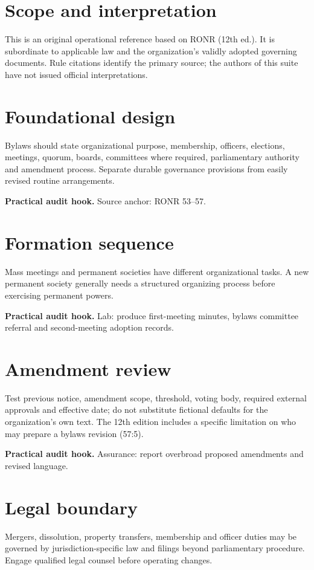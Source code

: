 \documentclass[11pt]{article}
\begin{document}
\SuiteOpen
\section{Scope and interpretation}
This is an original operational reference based on RONR (12th ed.). It is subordinate to applicable law and the organization’s validly adopted governing documents. Rule citations identify the primary source; the authors of this suite have not issued official interpretations.

\section{Foundational design}
Bylaws should state organizational purpose, membership, officers, elections, meetings, quorum, boards, committees where required, parliamentary authority and amendment process. Separate durable governance provisions from easily revised routine arrangements.

\textbf{Practical audit hook.} Source anchor: RONR 53--57.

\section{Formation sequence}
Mass meetings and permanent societies have different organizational tasks. A new permanent society generally needs a structured organizing process before exercising permanent powers.

\textbf{Practical audit hook.} Lab: produce first-meeting minutes, bylaws committee referral and second-meeting adoption records.

\section{Amendment review}
Test previous notice, amendment scope, threshold, voting body, required external approvals and effective date; do not substitute fictional defaults for the organization’s own text. The 12th edition includes a specific limitation on who may prepare a bylaws revision (57:5).

\textbf{Practical audit hook.} Assurance: report overbroad proposed amendments and revised language.

\section{Legal boundary}
Mergers, dissolution, property transfers, membership and officer duties may be governed by jurisdiction-specific law and filings beyond parliamentary procedure. Engage qualified legal counsel before operating changes.
\end{document}
